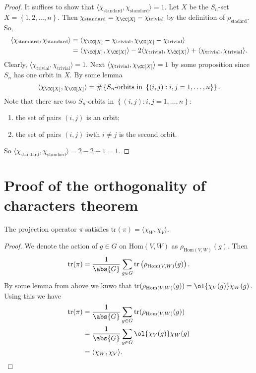 \documentclass[12pt, a4paper]{article}
\begin{document}
\begin{proof}
    It suffices to show that \(\langle \chi_{\text{standard}},\chi_{\text{standard}} \rangle =1\). Let \(X\) be the \(S_n\)-set \(X=\left\{ 1,2,\ldots,n \right\}\). Then \(\chi_{\text{standard}} = \chi_{\CC[X]}-\chi_{\text{trivial}}\) by the definition of \(\rho_{\text{stadard}}\). So,
    \[\begin{aligned}
        \langle \chi_{\text{standard}}, \chi_{\text{standard}}\rangle &= \langle \chi_{\CC[X]}-\chi_{\text{trivial}},\chi_{\CC[X]}-\chi_{\text{trivial}} \rangle \\
        &= \langle \chi_{\CC[X]},\chi_{\CC[X]} \rangle -2 \langle \chi_{\text{trivial}},\chi_{\CC[X]} \rangle + \langle \chi_{\text{trivial}},\chi_{\text{trivial}} \rangle.
    \end{aligned}\]
    Clearly, \(\langle \chi_{\text{trivial}},\chi_{\text{trivial}} \rangle =1\). Next \(\langle \chi_{\text{trivial}}, \chi_{\CC[X]} \rangle=1\) by some proposition since \(S_n\) has one orbit in \(X\). By some lemma 
    \[\langle \chi_{\CC[X]},\chi_{\CC[X]}\rangle = \#\left\{ S_n\text{-orbits in } \left\{ (i,j) : i,j=1,\ldots,n \right\} \right\}.\]
    Note that there are two \(S_n\)-orbits in \(\left\{ (i,j) : i,j=1,\ldots,n \right\}\):
    \begin{enumerate}
        \item the set of pairs \((i,j)\) is an orbit;
        \item the set of pairs \((i,j)\) iwth \(i\neq j\) is the second orbit.
    \end{enumerate}
    So \(\langle \chi_{\text{standard}}, \chi_{\text{standard}}\rangle=2-2+1=1 \).
\end{proof}

\section{Proof of the orthogonality of characters theorem}


\begin{lemma}
    The projection operator \(\pi\) satisfies \(\text{tr}(\pi)=\langle \chi_W,\chi_V \rangle\).
\end{lemma}

\begin{proof}
    We denote the action of \(g\in G\) on \(\text{Hom}(V,W)\) as \(\rho_{\text{Hom}(V,W)}(g)\). Then 
    \[\text{tr}(\pi)= \frac{1}{\abs{G}} \sum_{g\in G} \text{tr}\left( \rho_{\text{Hom}(V,W)}(g) \right).\]
    By some lemma from above we knwo that \(\text{tr}(\rho_{\text{Hom}(V,W)}(g)) = \ol{\chi_V(g)}\chi_W(g)\). Using this we have 
    \[\begin{aligned}
        \text{tr}(\pi) &= \frac{1}{\abs{G}} \sum_{g\in G} \text{tr}(\rho_{\text{Hom}(V,W)}(g)) \\
        &= \frac{1}{\abs{G}} \sum_{g\in G} \ol{\chi_V(g)}\chi_W(g) \\
        &= \langle \chi_W,\chi_V \rangle.
    \end{aligned}\]
\end{proof}
\end{document}
